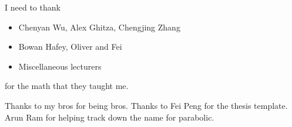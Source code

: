 I need to thank
\begin{itemize}
	\item Chenyan Wu,  Alex Ghitza,  Chengjing Zhang	
	\item Bowan Hafey, Oliver and Fei
        \item Miscellaneous lecturers
\end{itemize}
for the math that they taught me. 

Thanks to my bros for being bros. Thanks to Fei Peng for the thesis template. Arun Ram for helping track down the name for parabolic.
